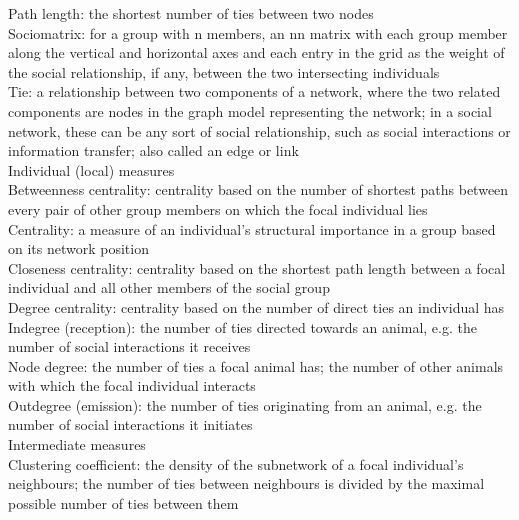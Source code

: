 Path length: the shortest number of ties between two nodes\\

Sociomatrix: for a group with n members, an nn matrix
with each group member along the vertical and horizontal
axes and each entry in the grid as the weight of the social relationship,
if any, between the two intersecting individuals\\

Tie: a relationship between two components of a network,
where the two related components are nodes in the graph
model representing the network; in a social network, these
can be any sort of social relationship, such as social interactions
or information transfer; also called an edge or link\\

Individual (local) measures\\

Betweenness centrality: centrality based on the number of
shortest paths between every pair of other group members
on which the focal individual lies\\

Centrality: a measure of an individual’s structural importance
in a group based on its network position\\

Closeness centrality: centrality based on the shortest path
length between a focal individual and all other members of
the social group\\

Degree centrality: centrality based on the number of direct
ties an individual has\\

Indegree (reception): the number of ties directed towards
an animal, e.g. the number of social interactions it receives\\

Node degree: the number of ties a focal animal has; the
number of other animals with which the focal individual
interacts\\

Outdegree (emission): the number of ties originating from
an animal, e.g. the number of social interactions it initiates\\

Intermediate measures\\

Clustering coefficient: the density of the subnetwork of a focal
individual’s neighbours; the number of ties between
neighbours is divided by the maximal possible number of
ties between them\\

